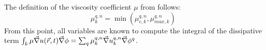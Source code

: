 %
The definition of the viscosity coefficient $\mu$ from  follows:
%
\begin{equation}\label{eq:visc2_sct2}
\mu_{k}^{q,n} = \min \left( \mu_{e,k}^{q,n}, \mu_{max,k}^{q,n} \right)
\end{equation}
%
From this point, all variables are known to compute the integral of the dissipative term $\int_{k} \mu \vec{\nabla} u(\vec{r},t) \vec{\nabla} \phi = \sum_q \mu_{k}^{q,n} \vec{\nabla} u_k^{q,n} \vec{\nabla} \phi^q$.

